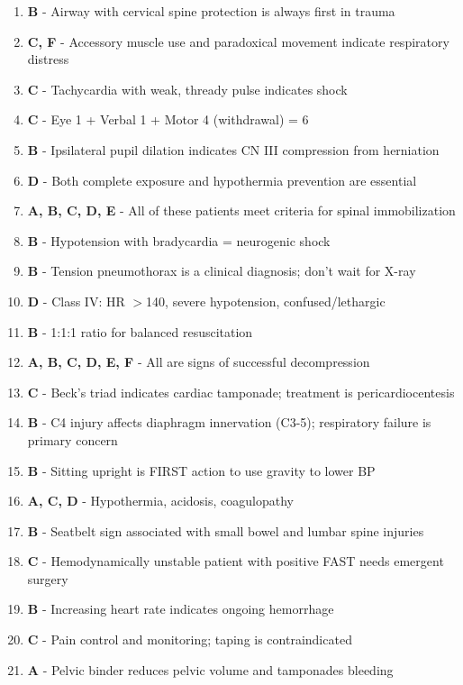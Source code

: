 \documentclass[11pt]{article}
\begin{document}
\begin{enumerate}
    \item \textbf{B} - Airway with cervical spine protection is always first in trauma
    \item \textbf{C, F} - Accessory muscle use and paradoxical movement indicate respiratory distress
    \item \textbf{C} - Tachycardia with weak, thready pulse indicates shock
    \item \textbf{C} - Eye 1 + Verbal 1 + Motor 4 (withdrawal) = 6
    \item \textbf{B} - Ipsilateral pupil dilation indicates CN III compression from herniation
    \item \textbf{D} - Both complete exposure and hypothermia prevention are essential
    \item \textbf{A, B, C, D, E} - All of these patients meet criteria for spinal immobilization
    \item \textbf{B} - Hypotension with bradycardia = neurogenic shock
    \item \textbf{B} - Tension pneumothorax is a clinical diagnosis; don't wait for X-ray
    \item \textbf{D} - Class IV: HR $>$140, severe hypotension, confused/lethargic
    \item \textbf{B} - 1:1:1 ratio for balanced resuscitation
    \item \textbf{A, B, C, D, E, F} - All are signs of successful decompression
    \item \textbf{C} - Beck's triad indicates cardiac tamponade; treatment is pericardiocentesis
    \item \textbf{B} - C4 injury affects diaphragm innervation (C3-5); respiratory failure is primary concern
    \item \textbf{B} - Sitting upright is FIRST action to use gravity to lower BP
    \item \textbf{A, C, D} - Hypothermia, acidosis, coagulopathy
    \item \textbf{B} - Seatbelt sign associated with small bowel and lumbar spine injuries
    \item \textbf{C} - Hemodynamically unstable patient with positive FAST needs emergent surgery
    \item \textbf{B} - Increasing heart rate indicates ongoing hemorrhage
    \item \textbf{C} - Pain control and monitoring; taping is contraindicated
    \item \textbf{A} - Pelvic binder reduces pelvic volume and tamponades bleeding

\end{enumerate}
\end{document}
